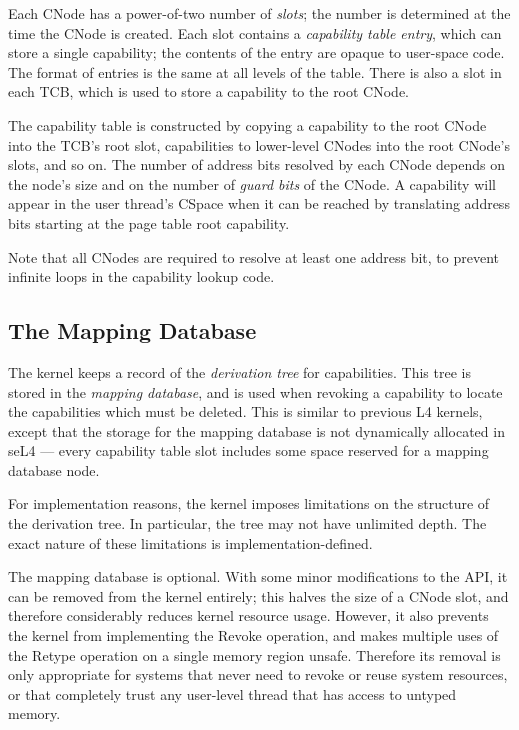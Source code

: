 Each CNode has a power-of-two number of \emph{slots}; the number is determined
at the time the CNode is created. Each slot contains a \emph{capability table
entry}, which can store a single capability; the contents of the entry are
opaque to user-space code. The format of entries is the same at all levels of
the table. There is also a slot in each TCB, which is used to store a
capability to the root CNode.

The capability table is constructed by copying a capability to the root CNode
into the TCB's root slot, capabilities to lower-level CNodes into the root
CNode's slots, and so on. The number of address bits resolved by each CNode
depends on the node's size and on the number of \emph{guard bits} of the CNode.
A capability will appear in the user thread's CSpace when it can be reached by
translating address bits starting at the page table root capability.

Note that all CNodes are required to resolve at least one address bit, to
prevent infinite loops in the capability lookup code.

\subsection{The Mapping Database}\label{sec:overview.cspace.mdb}

The kernel keeps a record of the \emph{derivation tree} for capabilities. This
tree is stored in the \emph{mapping database}, and is used when revoking a
capability to locate the capabilities which must be deleted. This is similar to
previous L4 kernels, except that the storage for the mapping database is not
dynamically allocated in seL4 --- every capability table slot includes some
space reserved for a mapping database node.

For implementation reasons, the kernel imposes limitations on the structure of
the derivation tree. In particular, the tree may not have unlimited depth. The
exact nature of these limitations is implementation-defined.

The mapping database is optional. With some minor modifications to the API, it
can be removed from the kernel entirely; this halves the size of a CNode slot,
and therefore considerably reduces kernel resource usage. However, it also
prevents the kernel from implementing the Revoke operation, and makes multiple
uses of the Retype operation on a single memory region unsafe. Therefore its
removal is only appropriate for systems that never need to revoke or reuse
system resources, or that completely trust any user-level thread that has
access to untyped memory.


